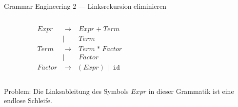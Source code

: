 \documentclass{beamer}
\begin{document}
\begin{frame}{Grammar Engineering 2 --- Linksrekursion eliminieren}
  \begin{columns}
    \begin{column}{0.5\textwidth}
      \begin{alignat*}{2}
        & Expr   & \; \to \; & Expr \; \texttt{+} \; Term \\
              && \mid \;\; & Term \\
        & Term   & \; \to \; & Term \; \texttt{*} \; Factor \\
                && \mid \;\; & Factor \\
        & Factor & \; \to \; & \texttt{(} \; Expr \; \texttt{)} \; \mid \; \texttt{id}
      \end{alignat*}

    \end{column}
    \begin{column}{0.5\textwidth}
      \begin{figure}
      \end{figure}
    \end{column}
  \end{columns}

  \vfill

  Problem: Die Linksableitung des Symbols $Expr$ in dieser Grammatik ist eine endlose Schleife.
\end{frame}
\end{document}
